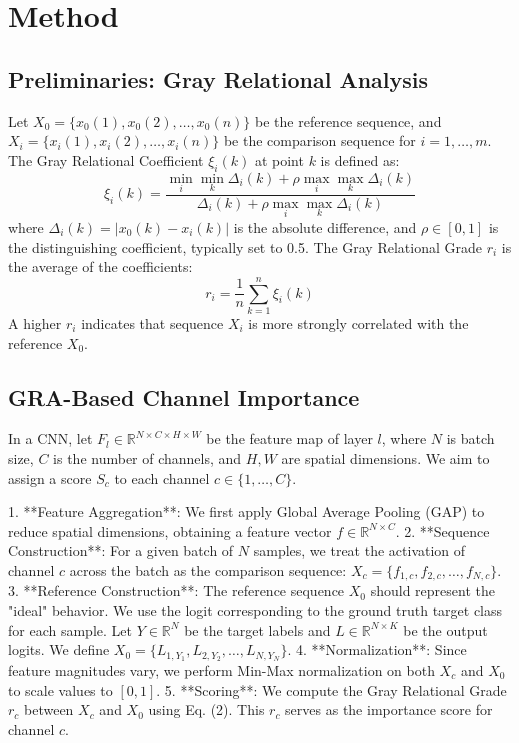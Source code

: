 \documentclass[sn-mathphys,Numbered]{sn-jnl}
\theoremstyle{thmstyleone}%
\theoremstyle{thmstyletwo}%
\theoremstyle{thmstylethree}%
\begin{document}
\section{Method}\label{sec3}

\subsection{Preliminaries: Gray Relational Analysis}
Let $X_0 = \{x_0(1), x_0(2), \dots, x_0(n)\}$ be the reference sequence, and $X_i = \{x_i(1), x_i(2), \dots, x_i(n)\}$ be the comparison sequence for $i = 1, \dots, m$. The Gray Relational Coefficient $\xi_i(k)$ at point $k$ is defined as:
\begin{equation}
    \xi_i(k) = \frac{\min_i \min_k \Delta_i(k) + \rho \max_i \max_k \Delta_i(k)}{\Delta_i(k) + \rho \max_i \max_k \Delta_i(k)}
\end{equation}
where $\Delta_i(k) = |x_0(k) - x_i(k)|$ is the absolute difference, and $\rho \in [0, 1]$ is the distinguishing coefficient, typically set to 0.5.
The Gray Relational Grade $r_i$ is the average of the coefficients:
\begin{equation}
    r_i = \frac{1}{n} \sum_{k=1}^{n} \xi_i(k)
\end{equation}
A higher $r_i$ indicates that sequence $X_i$ is more strongly correlated with the reference $X_0$.

\subsection{GRA-Based Channel Importance}
In a CNN, let $F_l \in \mathbb{R}^{N \times C \times H \times W}$ be the feature map of layer $l$, where $N$ is batch size, $C$ is the number of channels, and $H, W$ are spatial dimensions. We aim to assign a score $S_c$ to each channel $c \in \{1, \dots, C\}$.

1.  **Feature Aggregation**: We first apply Global Average Pooling (GAP) to reduce spatial dimensions, obtaining a feature vector $f \in \mathbb{R}^{N \times C}$.
2.  **Sequence Construction**: For a given batch of $N$ samples, we treat the activation of channel $c$ across the batch as the comparison sequence: $X_c = \{f_{1,c}, f_{2,c}, \dots, f_{N,c}\}$.
3.  **Reference Construction**: The reference sequence $X_0$ should represent the "ideal" behavior. We use the logit corresponding to the ground truth target class for each sample. Let $Y \in \mathbb{R}^{N}$ be the target labels and $L \in \mathbb{R}^{N \times K}$ be the output logits. We define $X_0 = \{L_{1, Y_1}, L_{2, Y_2}, \dots, L_{N, Y_N}\}$.
4.  **Normalization**: Since feature magnitudes vary, we perform Min-Max normalization on both $X_c$ and $X_0$ to scale values to $[0, 1]$.
5.  **Scoring**: We compute the Gray Relational Grade $r_c$ between $X_c$ and $X_0$ using Eq. (2). This $r_c$ serves as the importance score for channel $c$.
\end{document}
